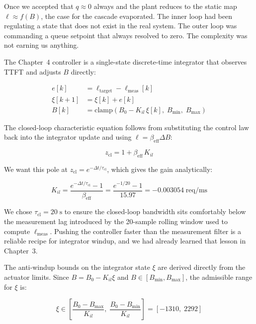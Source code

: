 \documentclass[11pt]{article}
\begin{document}
Once we accepted that $q \approx 0$ always and the plant reduces to the
static map $\ell \approx f(B)$, the case for the cascade evaporated.  The
inner loop had been regulating a state that does not exist in the real
system.  The outer loop was commanding a queue setpoint that always resolved
to zero.  The complexity was not earning us anything.

The Chapter~4 controller is a single-state discrete-time integrator that
observes TTFT and adjusts $B$ directly:

\begin{align}
    e[k]      &= \ell_{\mathrm{target}} - \ell_{\mathrm{meas}}[k] \\
    \xi[k+1]  &= \xi[k] + e[k] \label{eq:int} \\
    B[k]      &= \mathrm{clamp}\!\left(B_0 - K_{il}\,\xi[k],\;
                                       B_{\min},\; B_{\max}\right)
\end{align}

The closed-loop characteristic equation follows from substituting the
control law back into the integrator update and using $\ell = \beta_{\mathrm{eff}} \Delta B$:

\begin{equation}
    z_{\mathrm{cl}} = 1 + \beta_{\mathrm{eff}}\, K_{il}
\end{equation}

We want this pole at $z_{\mathrm{cl}} = e^{-\Delta t / \tau_{\mathrm{cl}}}$,
which gives the gain analytically:

\begin{equation}
    K_{il} = \frac{e^{-\Delta t/\tau_{\mathrm{cl}}} - 1}{\beta_{\mathrm{eff}}}
           = \frac{e^{-1/20} - 1}{15.97}
           = -0.003054 \;\text{req/ms}
\end{equation}

We chose $\tau_{\mathrm{cl}} = 20\;\text{s}$ to ensure the closed-loop
bandwidth sits comfortably below the measurement lag introduced by the
20-sample rolling window used to compute $\ell_{\mathrm{meas}}$.  Pushing
the controller faster than the measurement filter is a reliable recipe for
integrator windup, and we had already learned that lesson in Chapter~3.

The anti-windup bounds on the integrator state $\xi$ are derived directly
from the actuator limits.  Since $B = B_0 - K_{il}\xi$ and
$B \in [B_{\min}, B_{\max}]$, the admissible range for $\xi$ is:

\begin{equation}
    \xi \in \left[\frac{B_0 - B_{\max}}{K_{il}},\;
                   \frac{B_0 - B_{\min}}{K_{il}}\right]
         = [-1310,\; 2292]
\end{equation}
\end{document}
